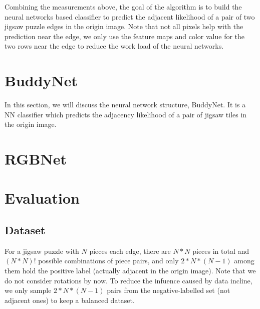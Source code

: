 \documentclass{article}
\begin{document}
Combining the measurements above, the goal of the algorithm is to build the neural networks based classifier to predict the adjacent likelihood of a pair of two jigsaw puzzle edges in the origin image. Note that not all pixels help with the prediction near the edge, we only use the feature maps and color value for the two rows near the edge to reduce the work load of the neural networks.

\section{BuddyNet}

In this section, we will discuss the neural network structure, BuddyNet. It is a NN classifier which predicts the adjacency likelihood of a pair of jigsaw tiles in the origin image.



\section{RGBNet}



\section{Evaluation}

\subsection{Dataset}

For a jigsaw puzzle with $N$ pieces each edge, there are $N*N$ pieces in total and $(N*N)!$ possible combinations of piece pairs, and only $2*N*(N-1)$ among them hold the positive label (actually adjacent in the origin image). Note that we do not consider rotations by now. To reduce the infuence caused by data incline, we only sample $2*N*(N-1)$ pairs from the negative-labelled set (not adjacent ones) to keep a balanced dataset.







\end{document}
